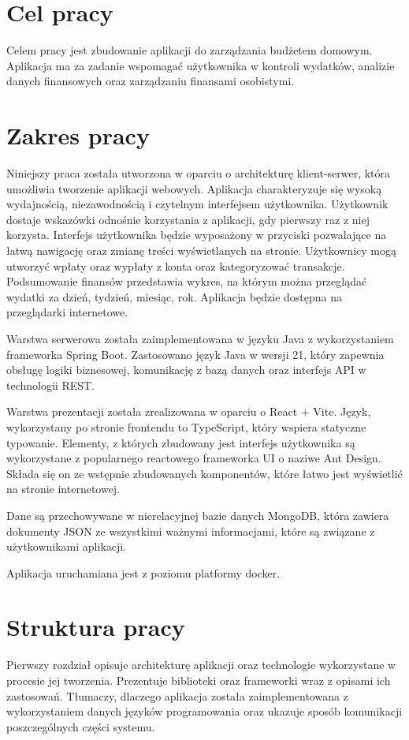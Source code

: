 \section{Cel pracy}
Celem pracy jest zbudowanie aplikacji do zarządzania budżetem domowym. Aplikacja ma za zadanie wspomagać użytkownika w kontroli wydatków, analizie danych finansowych oraz zarządzaniu finansami osobistymi.
\section{Zakres pracy}
Niniejszy praca została utworzona w oparciu o architekturę klient-serwer, która umożliwia tworzenie aplikacji webowych. Aplikacja charakteryzuje się wysoką wydajnością, niezawodnością i czytelnym interfejsem użytkownika. Użytkownik dostaje wskazówki odnośnie korzystania z aplikacji, gdy pierwszy raz z niej korzysta. Interfejs użytkownika będzie wyposażony w przyciski pozwalające na łatwą nawigację oraz zmianę treści wyświetlanych na stronie. Użytkownicy mogą utworzyć wpłaty oraz wypłaty z konta oraz kategoryzować transakcje. Podsumowanie finansów przedstawia wykres, na którym można przeglądać wydatki za dzień, tydzień, miesiąc, rok. Aplikacja będzie dostępna na przeglądarki internetowe.

Warstwa serwerowa została zaimplementowana w języku Java z wykorzystaniem frameworka Spring Boot. Zastosowano język Java w wersji 21, który zapewnia obsługę logiki biznesowej, komunikację z bazą danych oraz interfejs API w technologii REST.

Warstwa prezentacji została zrealizowana w oparciu o React + Vite. Język, wykorzystany po stronie frontendu to TypeScript, który wspiera statyczne typowanie.  Elementy, z których zbudowany jest interfejs użytkownika są wykorzystane z popularnego reactowego frameworka UI o naziwe Ant Design. Składa się on ze wstępnie zbudowanych komponentów, które łatwo jest wyświetlić na stronie internetowej.

Dane są przechowywane w nierelacyjnej bazie danych MongoDB, która zawiera dokumenty JSON ze wszystkimi ważnymi informacjami, które są związane z użytkownikami aplikacji.

Aplikacja uruchamiana jest z poziomu platformy docker.
\section{Struktura pracy}
Pierwszy rozdział opisuje architekturę aplikacji oraz technologie wykorzystane w procesie jej tworzenia. Prezentuje biblioteki oraz frameworki wraz z opisami ich zastosowań. Tłumaczy, dlaczego aplikacja została zaimplementowana z wykorzystaniem danych języków programowania oraz ukazuje sposób komunikacji poszczególnych części systemu.

